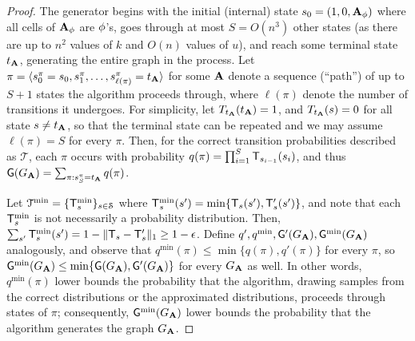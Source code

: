 \begin{proof}
The generator begins with the initial (internal) state $s_0 = (1, 0, \mathbf{A}_\phi)$ where all cells of $\mathbf{A}_\phi$ are $\phi$'s, goes through at most $S=O(n^3)$ other states (as there are up to $n^2$ values of $k$ and $O(n)$ values of $u$), and reach some terminal state $t_{\mathbf{A}}$, generating the entire graph in the process. Let $\pi = \langle s^\pi_0 = s_0, s^\pi_1, \ldots, s^\pi_{\ell(\pi)} = t_{\mathbf{A}} \rangle$ for some $\mathbf{A}$ denote a sequence (``path'') of up to $S+1$ states the algorithm proceeds through, where $\ell(\pi)$ denote the number of transitions it undergoes. For simplicity, let $T_{t_{\mathbf{A}}}(t_{\mathbf{A}})=1$, and $T_{t_{\mathbf{A}}}(s)=0$ for all state $s \neq t_{\mathbf{A}}$, so that the terminal state can be repeated and we may assume $\ell(\pi) = S$ for every $\pi$. Then, for the correct transition probabilities described as $\mathcal{T}$, each $\pi$ occurs with probability $q(\pi) = \prod_{i=1}^{S} \mathsf{T}_{s_{i-1}}(s_i)$, and thus $\mathsf{G}(G_{\mathbf{A}}) = \sum_{\pi:s^\pi_{S} = t_{\mathbf{A}}} q(\pi)$.

Let $\mathcal{T}^{\min}=\{\mathsf{T}^{\min}_s\}_{s\in\mathcal{S}}$ where $\mathsf{T}^{\min}_s(s') = \min\{\mathsf{T}_s(s'),\mathsf{T}'_s(s')\}$, and note that each $\mathsf{T}^{\min}_s$ is not necessarily a probability distribution. Then, $\sum_{s'} \mathsf{T}^{\min}_s(s') = 1 - \|\mathsf{T}_s-\mathsf{T}'_s\|_1 \geq 1-\epsilon$. Define $q', q^{\min}, \mathsf{G}'(G_{\mathbf{A}}),\mathsf{G}^{\min}(G_{\mathbf{A}})$ analogously, and observe that $q^{\min}(\pi) \leq \min\{q(\pi), q'(\pi)\}$ for every $\pi$, so $\mathsf{G}^{\min}(G_{\mathbf{A}}) \leq \min\{\mathsf{G}(G_{\mathbf{A}}),\mathsf{G}'(G_{\mathbf{A}})\}$ for every $G_{\mathbf{A}}$ as well. In other words, $q^{\min}(\pi)$ lower bounds the probability that the algorithm, drawing samples from the correct distributions or the approximated distributions, proceeds through states of $\pi$; consequently, $\mathsf{G}^{\min}(G_{\mathbf{A}})$ lower bounds the probability that the algorithm generates the graph $G_{\mathbf{A}}$.


\end{proof}
